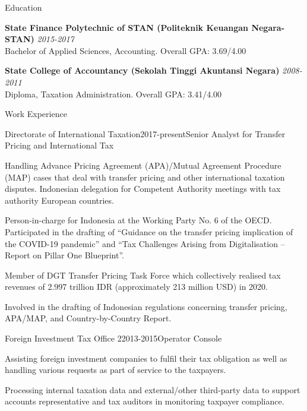 \documentclass{resume}
\begin{document}
\begin{rSection}{Education}


{\bf State Finance Polytechnic of STAN (Politeknik Keuangan Negara-STAN)} \hfill {\em 2015-2017} 
\\ Bachelor of Applied Sciences, Accounting.\hfill { Overall GPA: 3.69/4.00 }

{\bf State College of Accountancy (Sekolah Tinggi Akuntansi Negara)} \hfill {\em 2008-2011} 
\\ Diploma, Taxation Administration.\hfill { Overall GPA: 3.41/4.00 }

\end{rSection}

\begin{rSection}{Work Experience}
\begin{rSubsection}{Directorate of International Taxation}{2017-present}{Senior Analyst for Transfer Pricing and International Tax}{}
 \item Handling Advance Pricing Agreement (APA)/Mutual Agreement Procedure (MAP) cases that deal with transfer pricing and other international taxation disputes. Indonesian delegation for Competent Authority meetings with tax authority European countries.
 \item Person-in-charge for Indonesia at the Working Party No. 6 of the OECD. Participated in the drafting of “Guidance on the transfer pricing implication of the COVID-19 pandemic” and “Tax Challenges Arising from Digitalisation – Report on Pillar One Blueprint”.
 \item Member of DGT Transfer Pricing Task Force which collectively realised tax revenues of 2.997 trillion IDR (approximately 213 million USD) in 2020.
 \item Involved in the drafting of Indonesian regulations concerning transfer pricing, APA/MAP, and Country-by-Country Report.
\end{rSubsection}
\begin{rSubsection}{Foreign Investment Tax Office 2}{2013-2015}{Operator Console}{}
 \item Assisting foreign investment companies to fulfil their tax obligation as well as handling various requests as part of service to the taxpayers.
 \item Processing internal taxation data and external/other third-party data to support accounts representative and tax auditors in monitoring taxpayer compliance.
\end{rSubsection}
\end{rSection}
\end{document}
